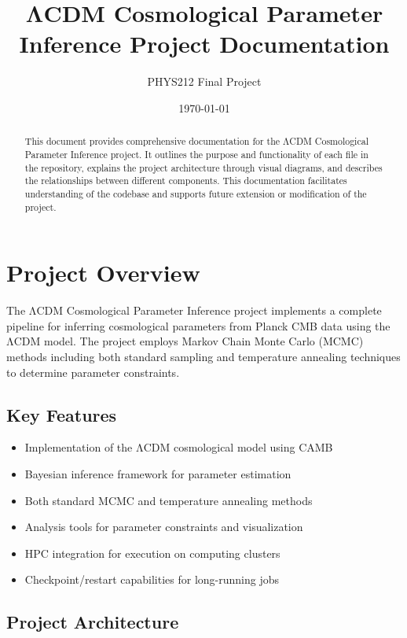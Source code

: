 \documentclass[11pt]{article}
\title{\LARGE \textbf{ΛCDM Cosmological Parameter Inference Project Documentation}}
\author{PHYS212 Final Project}
\date{\today}
\begin{document}
\maketitle

\begin{abstract}
    This document provides comprehensive documentation for the ΛCDM Cosmological Parameter Inference project. It outlines the purpose and functionality of each file in the repository, explains the project architecture through visual diagrams, and describes the relationships between different components. This documentation facilitates understanding of the codebase and supports future extension or modification of the project.
\end{abstract}

\tableofcontents

\newpage

\section{Project Overview}

The ΛCDM Cosmological Parameter Inference project implements a complete pipeline for inferring cosmological parameters from Planck CMB data using the ΛCDM model. The project employs Markov Chain Monte Carlo (MCMC) methods including both standard sampling and temperature annealing techniques to determine parameter constraints.

\subsection{Key Features}

\begin{itemize}
    \item Implementation of the ΛCDM cosmological model using CAMB
    \item Bayesian inference framework for parameter estimation
    \item Both standard MCMC and temperature annealing methods
    \item Analysis tools for parameter constraints and visualization
    \item HPC integration for execution on computing clusters
    \item Checkpoint/restart capabilities for long-running jobs
\end{itemize}

\subsection{Project Architecture}
\end{document}
